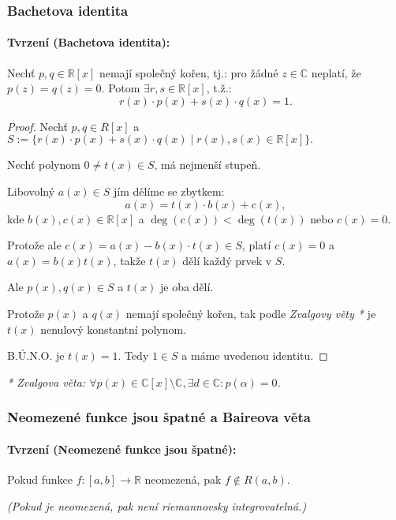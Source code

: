\documentclass[10pt,a4paper]{article}
\newcommand{\R}{{\mathbb{R}}}
\newcommand{\Cc}{{\mathbb{C}}}
\begin{document}
\subsubsection{Bachetova identita}

\paragraph*{Tvrzení (Bachetova identita):} Nechť $p,q\in \R[x]$ nemají společný kořen, tj.: 
pro žádné $z \in \Cc$ neplatí, že $p(z) = q(z) = 0$. Potom $\exists r,s \in \R[x]$, t.ž.:
\[
    r(x) \cdot p(x) + s(x) \cdot q(x) = 1.
\]

\begin{proof}
    Nechť $p,q \in R[x]$ a $S := \{r(x) \cdot p(x) + s(x) \cdot q(x) \mid r(x), s(x) \in \R[x]\}.$
    
    Nechť polynom $0 \neq t(x) \in S$, má nejmenší stupeň. 
    
    Libovolný $a(x) \in S$ jím dělíme se zbytkem:
    \[
        a(x) = t(x) \cdot b(x) + c(x) ,
    \]
    kde $b(x), c(x) \in \R[x]$ a $\deg (c(x)) < \deg (t(x))$ nebo $c(x) = 0$. 

    Protože ale $c(x) = a(x) - b(x) \cdot t(x) \in S$, platí $c(x) = 0$ a $a(x) = b(x)t(x)$, takže $t(x)$ dělí každý prvek v $S$.
    
    Ale $p(x), q(x) \in S$ a $t(x)$ je oba dělí. 
    
    Protože $p(x)$ a $q(x)$ nemají společný kořen, tak podle \textit{Zvalgovy věty *} je $t(x)$ nenulový konstantní polynom.
    
    B.Ú.N.O. je $t(x) = 1$. Tedy $1 \in S$ a máme uvedenou identitu.  
\end{proof}

\textit{* Zvalgova věta: $\forall p(x) \in \Cc[x] \setminus \Cc, \exists d \in \Cc: p(\alpha) = 0$.}
\newpage

\subsubsection{Neomezené funkce jsou špatné a Baireova věta}
\paragraph*{Tvrzení (Neomezené funkce jsou špatné):} Pokud funkce $f : [a, b] \to \R$ neomezená, pak $f \notin R(a, b)$.

\textit{(Pokud je neomezená, pak není riemannovsky integrovatelná.)}
\end{document}
